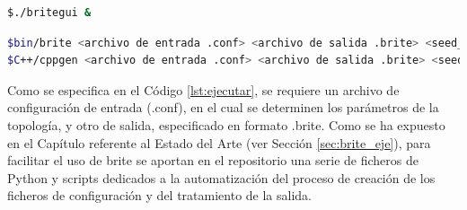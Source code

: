 \begin{lstlisting}[language=bash, style=Consola, caption={Ejecución de la interfaz gráfica de \gls{brite}}, label={lst:britegui}]
$./britegui &
\end{lstlisting}

\vspace{3mm}

\begin{lstlisting}[language=bash, style=Consola, caption={Ejecucion de \gls{brite} por la línea de comandos}, label={lst:ejecutar}]
$bin/brite <archivo de entrada .conf> <archivo de salida .brite> <seed_file>  
$C++/cppgen <archivo de entrada .conf> <archivo de salida .brite> <seed_file>
\end{lstlisting}

\vspace{3mm}

Como se especifica en el Código \ref{lst:ejecutar}, se requiere un archivo de configuración de entrada (.conf), en el cual se determinen los parámetros de la topología, y otro de salida, especificado en formato .brite. Como se ha expuesto en el Capítulo referente al Estado del Arte (ver Sección \ref{sec:brite_eje}), para facilitar el uso de \gls{brite} se aportan en el repositorio una serie de ficheros de Python y scripts dedicados a la automatización del proceso de creación de los ficheros de configuración y del tratamiento de la salida.























